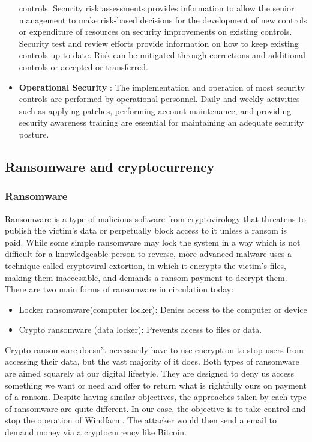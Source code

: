 \documentclass[twosided,a4,10pt]{article}
\begin{document}
\begin{multicols}{2}
\begin{itemize}
    controls. Security risk assessments provides information to allow the
    senior management to make risk-based decisions for the development of
    new controls or expenditure of resources on security improvements on existing controls. Security test and review efforts provide information on
    how to keep existing controls up to date. Risk can be mitigated through
    corrections and additional controls or accepted or transferred.
    \item \textbf{Operational Security} : The implementation and operation of most
    security controls are performed by operational personnel. Daily and weekly
    activities such as applying patches, performing account maintenance, and
    providing security awareness training are essential for maintaining an
    adequate security posture.
\end{itemize}


 
\subsection{Ransomware and cryptocurrency}
\subsubsection{Ransomware}
Ransomware is a type of malicious software from cryptovirology that threatens to publish the victim's data or perpetually block access to it unless a ransom is paid. While some simple ransomware may lock the system in a way which is not difficult for a knowledgeable person to reverse, more advanced malware uses a technique called cryptoviral extortion, in which it encrypts the victim's files, making them inaccessible, and demands a ransom payment to decrypt them.\newline
There are two main forms of ransomware in circulation today:
\begin{itemize}
    \item Locker ransomware(computer locker):
Denies access to the
computer or device
\item Crypto ransomware
(data locker): Prevents
access to files or data.
\end{itemize}
Crypto ransomware doesn’t necessarily have to use encryption to stop users from accessing their data, but the vast majority of it does. Both types of ransomware are aimed squarely at our digital lifestyle. They are designed to deny us access something we want or need and offer to return what is rightfully ours on payment of a ransom. Despite having similar objectives, the approaches taken by each type of ransomware are quite different.
In our case, the objective is to take control and stop the operation of Windfarm. The attacker would then send a email to demand money via a cryptocurrency like Bitcoin.


\end{multicols}
\end{document}
